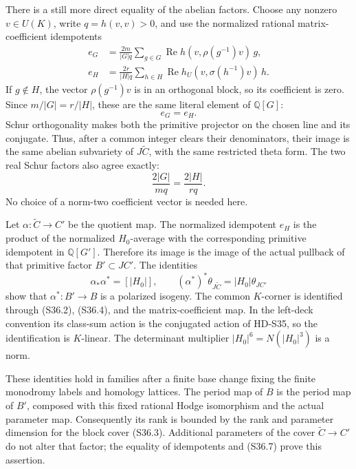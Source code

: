 There is a still more direct equality of the abelian factors.
Choose any nonzero \(v\in U(K)\), write \(q=h(v,v)>0\), and
use the normalized rational matrix-coefficient idempotents
\[
\begin{split}
 e_G&=\frac{2m}{|G|q}\sum_{g\in G}
        \operatorname{Re}h(v,\rho(g^{-1})v)\,g,\\
 e_H&=\frac{2r}{|H|q}\sum_{h\in H}
        \operatorname{Re}h_U(v,\sigma(h^{-1})v)\,h.
\end{split}                                                  \tag{S36.4}
\]
If \(g\notin H\), the vector \(\rho(g^{-1})v\) is in an
orthogonal block, so its coefficient is zero. Since
\(m/|G|=r/|H|\), these are the same literal element of
\(\mathbb Q[G]\):
\[
                             e_G=e_H.                        \tag{S36.5}
\]
Schur orthogonality makes both the primitive projector on the chosen
line and its conjugate. Thus, after a common integer clears their
denominators, their image is the same abelian subvariety of
\(J\widetilde C\), with the same restricted theta form.
The two real Schur factors also agree exactly:
\[
                  \frac{2|G|}{mq}=\frac{2|H|}{rq}.            \tag{S36.6}
\]
No choice of a norm-two coefficient vector is needed here.

Let \(\alpha:\widetilde C\to C'\) be the quotient map.
The normalized idempotent \(e_H\) is the product of the normalized
\(H_0\)-average with the corresponding primitive idempotent in
\(\mathbb Q[G']\). Therefore its image is the image of the
actual pullback of that primitive factor \(B'\subset JC'\).
The identities
\[
             \alpha_*\alpha^*=[|H_0|],\qquad
             (\alpha^*)^*\theta_{J\widetilde C}
                        =|H_0|\theta_{JC'}                  \tag{S36.7}
\]
show that \(\alpha^*:B'\to B\) is a polarized isogeny.
The common \(K\)-corner is identified through (S36.2), (S36.4),
and the matrix-coefficient map. In the left-deck convention its
class-sum action is the conjugated action of HD-S35, so the
identification is \(K\)-linear. The determinant multiplier
\(|H_0|^6=N(|H_0|^3)\) is a norm.

These identities hold in families after a finite base change fixing
the finite monodromy labels and homology lattices. The period map of
\(B\) is the period map of \(B'\), composed with this fixed rational
Hodge isomorphism and the actual parameter map. Consequently its
rank is bounded by the rank and parameter dimension for the block
cover (S36.3). Additional parameters of the cover
\(\widetilde C\to C'\) do not alter that factor; the equality
of idempotents and (S36.7) prove this assertion.

